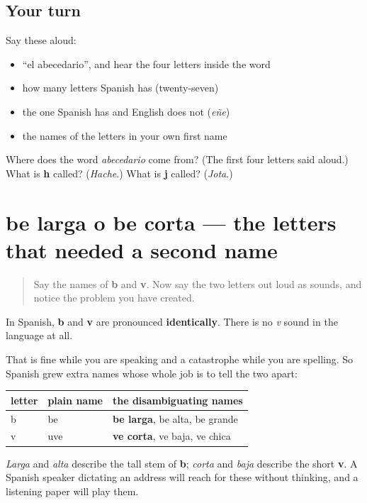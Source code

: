 \subsection*{Your turn}
Say these aloud:

\begin{itemize}
\raggedright
  \item \textquotedblleft{}el abecedario\textquotedblright{}, and hear the four letters inside the word
  \item how many letters Spanish has (twenty-seven)
  \item the one Spanish has and English does not (\emph{eñe})
  \item the names of the letters in your own first name
\end{itemize}

\begin{tcolorbox}[breakable,colback=teal!4,colframe=teal!35!black,title={Before you move on}]
Where does the word \emph{abecedario} come from? (The first four letters said aloud.) What is \textbf{h} called? (\emph{Hache}.) What is \textbf{j} called? (\emph{Jota}.)
\end{tcolorbox}
\section[be larga o be corta]{be larga o be corta — the letters that needed a second name}

\label{lesson:ES-C425-dos-nombres}



\begin{quote}
Say the names of \textbf{b} and \textbf{v}. Now say the two letters out loud as sounds, and notice the problem you have created.
\end{quote}

\begin{cousinweb}
In Spanish, \textbf{b} and \textbf{v} are pronounced \textbf{identically}. There is no \emph{v} sound in the language at all.

That is fine while you are speaking and a catastrophe while you are spelling. So Spanish grew extra names whose whole job is to tell the two apart:

\noindent
\begin{tabularx}{\linewidth}{@{}>{\raggedright\arraybackslash}X>{\raggedright\arraybackslash}X>{\raggedright\arraybackslash}X@{}}
\toprule
\textbf{letter} & \textbf{plain name} & \textbf{the disambiguating names} \\
\midrule
b & be & \textbf{be larga}, be alta, be grande \\
v & uve & \textbf{ve corta}, ve baja, ve chica \\
\bottomrule
\end{tabularx}

\emph{Larga} and \emph{alta} describe the tall stem of \textbf{b}; \emph{corta} and \emph{baja} describe the short \textbf{v}. A Spanish speaker dictating an address will reach for these without thinking, and a listening paper will play them.
\end{cousinweb}


